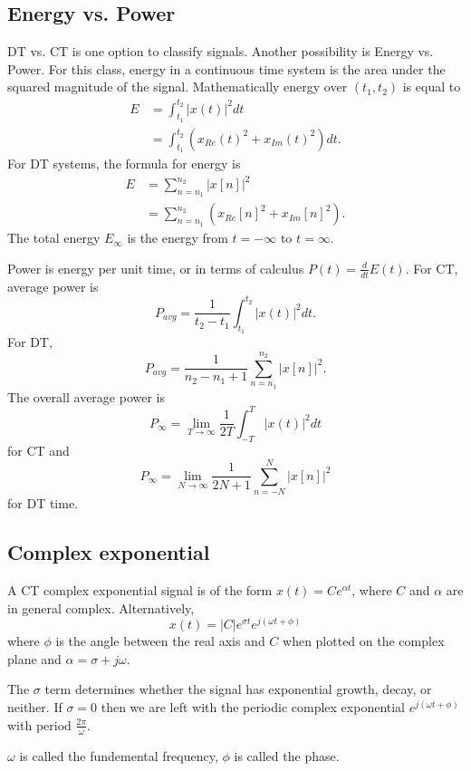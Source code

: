 \subsection{Energy vs. Power}
DT vs. CT is one option to classify signals. Another
possibility is Energy vs. Power. For this class, energy in a continuous
time system is the area under the squared magnitude of the signal. Mathematically
energy over $(t_1, t_2)$ is equal to
\begin{align}
    E & = \int_{t_1}^{t_2} |x(t)|^2 dt                     \\
      & = \int_{t_1}^{t_2} (x_{Re}(t)^2 + x_{Im}(t)^2) dt.
\end{align}
For DT systems, the formula for energy is
\begin{align}
    E & = \sum_{n=n_1}^{n_2} |x[n]|^2                     \\
      & = \sum_{n=n_1}^{n_2} (x_{Re}[n]^2 + x_{Im}[n]^2).
\end{align}
The total energy $E_\infty$ is the energy from $t = -\infty$ to $t = \infty$.

Power is energy per unit time, or in terms of calculus $P(t) = \frac{d}{dt}E(t)$.
For CT, average power is
\begin{equation}
    P_{avg} = \frac{1}{t_2 - t_1} \int_{t_1}^{t_2} |x(t)|^2 dt.
\end{equation}
For DT,
\begin{equation}
    P_{avg} = \frac{1}{n_2 - n_1 + 1} \sum_{n=n_1}^{n_2} |x[n]|^2.
\end{equation}
The overall average power is
\begin{equation}
    P_{\infty} = \lim_{T \rightarrow \infty} \frac{1}{2T} \int_{-T}^{T} |x(t)|^2 dt
\end{equation}
for CT and
\begin{equation}
    P_{\infty} = \lim_{N \rightarrow \infty} \frac{1}{2N + 1} \sum_{n=-N}^{N} |x[n]|^2
\end{equation}
for DT time.

\subsection{Complex exponential}
A CT complex exponential signal is of the form 
$x(t) = Ce^{\alpha t}$, where $C$ and $\alpha$ 
are in general complex. Alternatively, 
\begin{equation}
    x(t) = |C| e^{\sigma t} e^{j(\omega t + \phi)}
\end{equation}
where $\phi$ is the angle between the real axis and 
$C$ when plotted on the complex plane and $\alpha = \sigma + j\omega$. 

The $\sigma$ term determines whether the signal has exponential 
growth, decay, or neither. If $\sigma = 0$ then we are left 
with the periodic complex exponential $e^{j(\omega t + \phi)}$ 
with period $\frac{2\pi}{\omega}$. 

$\omega$ is called the fundemental frequency, 
$\phi$ is called the phase. 